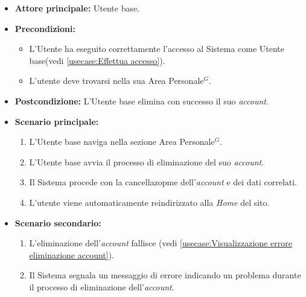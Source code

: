 \label{usecase:Eliminazione account}
\begin{itemize}
	\item \textbf{Attore principale:} Utente base.

	\item \textbf{Precondizioni:}
	\begin{itemize}
        \item L'Utente ha eseguito correttamente l'accesso al Sistema come Utente base(vedi \autoref{usecase:Effettua accesso}).
        \item L'utente deve trovarsi nella sua Area Personale$^G$.
    \end{itemize}

	\item \textbf{Postcondizione:} L'Utente base elimina con successo il suo \textit{account}.

	\item \textbf{Scenario principale:}
	      \begin{enumerate}
		      \item L'Utente base naviga nella sezione Area Personale$^G$.
		      \item L'Utente base avvia il processo di eliminazione del suo \textit{account}.
              \item Il Sistema procede con la cancellazopme dell'\textit{account} e dei dati correlati.
              \item L'utente viene automaticamente reindirizzato alla \textit{Home} del sito.
	      \end{enumerate}
	\item \textbf{Scenario secondario:}
			\begin{enumerate}
				\item L'eliminazione dell'\textit{account} fallisce (vedi \autoref{usecase:Visualizzazione errore eliminazione account}).
				\item Il Sistema segnala un messaggio di errore indicando un problema durante il processo di eliminazione dell'\textit{account}.
			\end{enumerate}
\end{itemize}